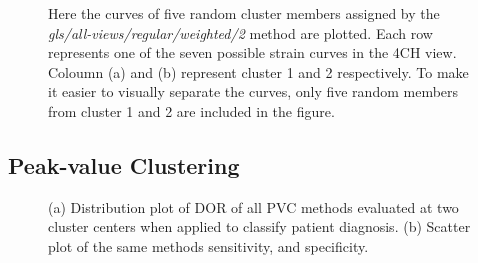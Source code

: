 \clearpage

\begin{figure}[ht]
    \centering
    
    \caption{Here the curves of five random cluster members assigned by the \textit{gls/all-views/regular/weighted/2} method are plotted.
             Each row represents one of the seven possible strain curves in the 4CH view. Coloumn (a) and (b) represent cluster 1 and 2 respectively.
             To make it easier to visually separate the curves, only five random members from cluster 1 and 2 are included in the figure.}
    \label{fig:five_members_gls_rls_4CH_regular_complete_two}
\end{figure}

\clearpage

\subsection{Peak-value Clustering}

\begin{figure}[H]
    \centering
    
    \caption{(a) Distribution plot of DOR of all PVC methods evaluated at two cluster centers when applied to classify patient diagnosis.
             (b) Scatter plot of the same methods sensitivity, and specificity.}
    \label{fig:pvc_ind_dor_sens_spec_dist}
\end{figure}

